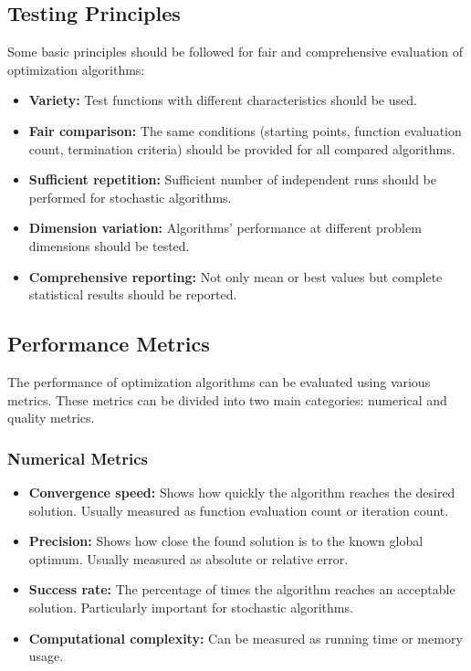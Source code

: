 \subsection{Testing Principles}

Some basic principles should be followed for fair and comprehensive evaluation of optimization algorithms:

\begin{itemize}
    \item \textbf{Variety:} Test functions with different characteristics should be used.
    
    \item \textbf{Fair comparison:} The same conditions (starting points, function evaluation count, termination criteria) should be provided for all compared algorithms.
    
    \item \textbf{Sufficient repetition:} Sufficient number of independent runs should be performed for stochastic algorithms.
    
    \item \textbf{Dimension variation:} Algorithms' performance at different problem dimensions should be tested.
    
    \item \textbf{Comprehensive reporting:} Not only mean or best values but complete statistical results should be reported.
\end{itemize}

\subsection{Performance Metrics}

The performance of optimization algorithms can be evaluated using various metrics. These metrics can be divided into two main categories: numerical and quality metrics.

\subsubsection{Numerical Metrics}

\begin{itemize}
    \item \textbf{Convergence speed:} Shows how quickly the algorithm reaches the desired solution. Usually measured as function evaluation count or iteration count.
    
    \item \textbf{Precision:} Shows how close the found solution is to the known global optimum. Usually measured as absolute or relative error.
    
    \item \textbf{Success rate:} The percentage of times the algorithm reaches an acceptable solution. Particularly important for stochastic algorithms.
    
    \item \textbf{Computational complexity:} Can be measured as running time or memory usage.
\end{itemize}


